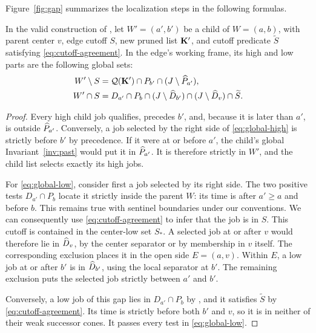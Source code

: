 Figure~\ref{fig:gap} summarizes the localization steps in the following
formulas.

\begin{lemma}\label{lem:global-child}
In the valid construction of , let
\(W'=(a',b')\) be a child of \(W=(a,b)\), with parent center \(v\),
edge cutoff \(S\), new pruned list \(\mathbf K'\), and cutoff predicate
\(\widetilde S\) satisfying \eqref{eq:cutoff-agreement}.
In the edge's working frame, its high and low parts are the
following global sets:
\begin{align}
 W'\setminus S
 &=\mathcal Q(\mathbf K')\cap P_{b'}\cap(J\setminus\widehat P_{a'}),
 \label{eq:global-high}\\
 W'\cap S
 &=D_{a'}\cap P_b\cap(J\setminus\widehat D_{b'})
                  \cap(J\setminus\widehat D_{v})\cap\widetilde S .
 \label{eq:global-low}
\end{align}
\end{lemma}
\begin{proof}
Every high child job qualifies, precedes \(b'\), and, because
it is later than \(a'\), is outside \(\widehat P_{a'}\).
Conversely, a job selected by the right side of
\eqref{eq:global-high} is strictly before \(b'\) by precedence.
If it were at or before \(a'\), the child's global
Invariant~\ref{inv:past} would put it in \(\widehat P_{a'}\).
It is therefore strictly in \(W'\), and the child list selects
exactly its high jobs.

For \eqref{eq:global-low}, consider first a job selected by its
right side. The two positive tests \(D_{a'}\cap P_b\) locate
it strictly inside the parent \(W\): its time is after
\(a'\ge a\) and before \(b\). This remains true with sentinel
boundaries under our conventions.
We can consequently use \eqref{eq:cutoff-agreement} to infer
that the job is in \(S\).
This cutoff is contained in the center-low set \(S_*\).
A selected job at or after \(v\) would therefore lie in
\(\widehat D_{v}\), by the center separator or by membership in \(v\)
itself. The corresponding exclusion places it in the open side
\(E=(a,v)\).
Within \(E\), a low job at or after \(b'\) is in
\(\widehat D_{b'}\), using the local separator at \(b'\).
The remaining exclusion puts the selected job strictly between
\(a'\) and \(b'\).

Conversely, a low job of this gap lies in \(D_{a'}\cap P_b\)
by , and it satisfies
\(\widetilde S\) by \eqref{eq:cutoff-agreement}.
Its time is strictly before both \(b'\) and \(v\), so it is
in neither of their weak successor cones. It passes every test
in \eqref{eq:global-low}.
\end{proof}

